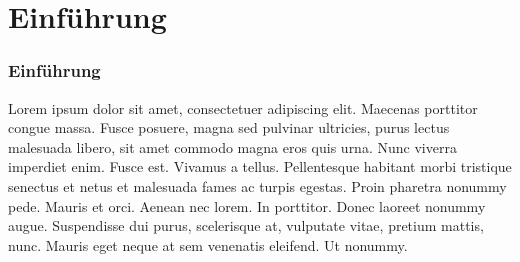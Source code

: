 \section{Einführung}

\begin{frame}
    \frametitle{Einführung}
		
    Lorem ipsum dolor sit amet, consectetuer adipiscing elit. Maecenas porttitor congue massa. Fusce posuere, magna sed pulvinar ultricies, purus lectus malesuada libero, sit amet commodo magna eros quis urna.
    Nunc viverra imperdiet enim. Fusce est. Vivamus a tellus.
    Pellentesque habitant morbi tristique senectus et netus et malesuada fames ac turpis egestas. Proin pharetra nonummy pede. Mauris et orci.
    Aenean nec lorem. In porttitor. Donec laoreet nonummy augue.
    Suspendisse dui purus, scelerisque at, vulputate vitae, pretium mattis, nunc. Mauris eget neque at sem venenatis eleifend. Ut nonummy.      
\end{frame}